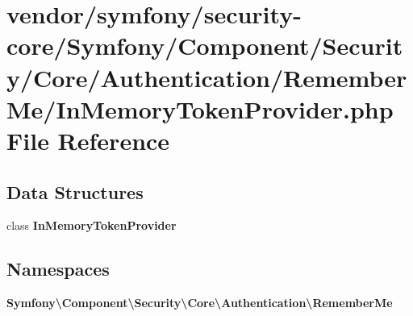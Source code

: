\section{vendor/symfony/security-\/core/\+Symfony/\+Component/\+Security/\+Core/\+Authentication/\+Remember\+Me/\+In\+Memory\+Token\+Provider.php File Reference}
\label{_in_memory_token_provider_8php}
\subsection*{Data Structures}
\begin{DoxyCompactItemize}
\item 
class {\bf In\+Memory\+Token\+Provider}
\end{DoxyCompactItemize}
\subsection*{Namespaces}
\begin{DoxyCompactItemize}
\item 
 {\bf Symfony\textbackslash{}\+Component\textbackslash{}\+Security\textbackslash{}\+Core\textbackslash{}\+Authentication\textbackslash{}\+Remember\+Me}
\end{DoxyCompactItemize}
